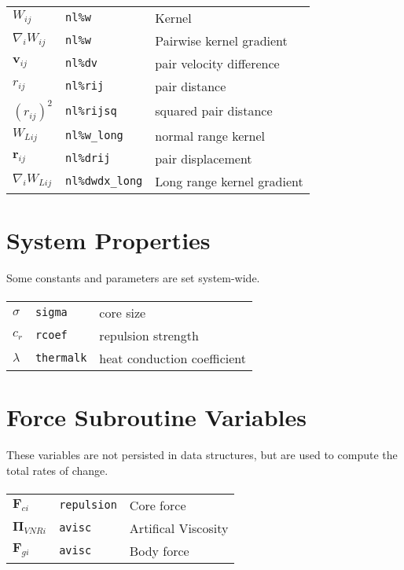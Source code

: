 \paragraph{}
\begin{tabularx}{\textwidth}{lll} \toprule
$W_{ij}$ & \texttt{nl\%w}  & Kernel \\
$\nabla_{i}W_{ij}   $ & \texttt{nl\%w} & Pairwise kernel gradient \\
$ \mathbold{v}_{ij} $ & \texttt{nl\%dv}         & pair velocity difference \\
$ r_{ij}            $ & \texttt{nl\%rij}        & pair distance \\
$ \left(r_{ij}\right)^{2} $ & \texttt{nl\%rijsq}      & squared pair distance \\
$ W_{Lij}         $ & \texttt{nl\%w\_long}    & normal range kernel \\
$\mathbold{r}_{ij}  $ & \texttt{nl\%drij} & pair displacement \\
$\nabla_{i}W_{Lij} $ & \texttt{nl\%dwdx\_long} & Long range kernel gradient \\
\end{tabularx}

\section{System Properties}
Some constants and parameters are set system-wide.

\paragraph{}
\begin{tabularx}{\textwidth}{lll} \toprule
$\sigma $ & \texttt{sigma} & core size \\
$c_{r} $     & \texttt{rcoef}   & repulsion strength \\
$\lambda$       &  \texttt{thermalk} & heat conduction coefficient \\
\end{tabularx}

\section{Force Subroutine Variables}
These variables are not persisted in data structures, but are used to compute
the total rates of change.

\paragraph{}
\begin{tabularx}{\textwidth}{lll} \toprule
$\mathbold{F}_{ci} $& \texttt{repulsion} & Core force\\
$\mathbold{\Pi}_{VNRi}$ & \texttt{avisc} & Artifical Viscosity\\
$\mathbold{F}_{gi}$ & \texttt{avisc} & Body force\\
\end{tabularx}

